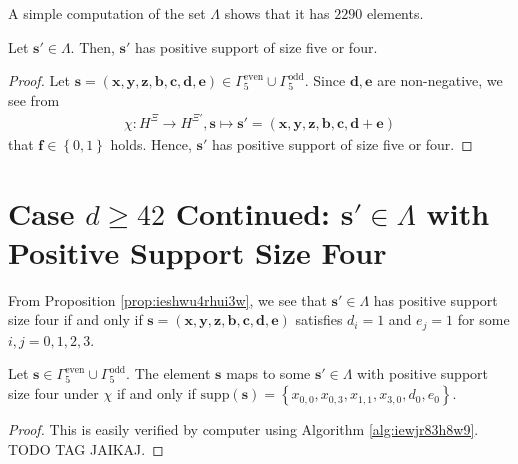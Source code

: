 A simple computation of the set \( \Lambda \) shows that it has \( 2290 \) elements.

\begin{proposition}\label{prop:ieshwu4rhui3w}
    Let \( \mathbf{s}' \in \Lambda \). Then, \( \mathbf{s}' \) has positive support of size five or four.
\end{proposition}

\begin{proof}
    Let \( \mathbf{s} = (\mathbf{x}, \mathbf{y}, \mathbf{z}, \mathbf{b}, \mathbf{c}, \mathbf{d}, \mathbf{e}) \in  \Gamma^{\mathrm{even}}_5 \cup \Gamma^{\mathrm{odd}}_5 \). Since \( \mathbf{d}, \mathbf{e} \) are non-negative, we see from
    \begin{gather*}
        \chi: H^\Xi \to H^{\Xi'}, \mathbf{s} \mapsto \mathbf{s}' = (\mathbf{x}, \mathbf{y}, \mathbf{z}, \mathbf{b}, \mathbf{c}, \mathbf{d} + \mathbf{e})
    \end{gather*}
    that \( \mathbf{f} \in \left\{ 0,1 \right\} \) holds. Hence, \( \mathbf{s}' \) has positive support of size five or four.
\end{proof}

\section{Case \( d \geq 42\) Continued: \( \mathbf{s}' \in \Lambda\) with Positive Support Size Four}

\begin{corollary}
    From Proposition \ref{prop:ieshwu4rhui3w}, we see that \( \mathbf{s}' \in \Lambda \) has positive support size four if and only if \( \mathbf{s} = (\mathbf{x}, \mathbf{y}, \mathbf{z}, \mathbf{b}, \mathbf{c}, \mathbf{d}, \mathbf{e}) \) satisfies \( d_i = 1 \) and \( e_j = 1 \) for some \( i,j = 0, 1,2,3 \).
\end{corollary}

\begin{corollary}
    Let \( \mathbf{s} \in \Gamma^{\mathrm{even}}_5 \cup \Gamma^{\mathrm{odd}}_5 \). The element \( \mathbf{s} \) maps to some \( \mathbf{s}' \in \Lambda \) with positive support size four under \( \chi \) if and only if \( \mathrm{supp}(\mathbf{s}) = \left\{ x_{0,0}, x_{0,3}, x_{1,1}, x_{3,0}, d_0, e_0 \right\} \).
\end{corollary}

\begin{proof}
    This is easily verified by computer using Algorithm \ref{alg:iewjr83h8w9}. TODO TAG JAIKAJ.
\end{proof}

